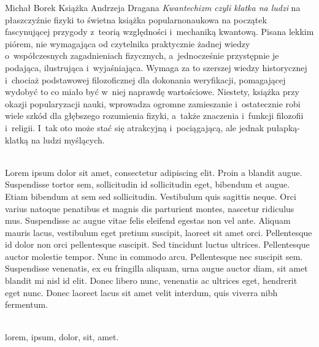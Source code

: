 \begin{newrevplenv}{Michał Borek}
Książka Andrzeja Dragana \textit{Kwantechizm czyli klatka na ludzi} na płaszczyźnie fizyki to świetna książka popularnonaukowa na początek fascynującej przygody z~teorią względności i~mechaniką kwantową. Pisana lekkim piórem, nie wymagająca od czytelnika praktycznie żadnej wiedzy o~współczesnych zagadnieniach fizycznych, a~jednocześnie przystępnie je podająca, ilustrująca i~wyjaśniająca. Wymaga za to szerszej wiedzy historycznej i~chociaż podstawowej filozoficznej dla dokonania weryfikacji, pomagającej wydobyć to co miało być w~niej naprawdę wartościowe. Niestety, książka przy okazji popularyzacji nauki, wprowadza ogromne zamieszanie i~ostatecznie robi wiele szkód dla głębszego rozumienia fizyki, a~także znaczenia i~funkcji filozofii i~religii. I~tak oto może stać się atrakcyjną i~pociągającą, ale jednak pułapką-klatką na ludzi myślących.





\vspace{5mm}%
\begin{flushright}
{\chaptitleeng\color{black!50}{A cage for thinking people}}
\end{flushright}

{}\\
{Lorem ipsum dolor sit amet, consectetur adipiscing elit. Proin a blandit augue. Suspendisse tortor sem, sollicitudin id sollicitudin eget, bibendum et augue. Etiam bibendum at sem sed sollicitudin. Vestibulum quis sagittis neque. Orci varius natoque penatibus et magnis dis parturient montes, nascetur ridiculus mus. Suspendisse ac augue vitae felis eleifend egestas non vel ante. Aliquam mauris lacus, vestibulum eget pretium suscipit, laoreet sit amet orci. Pellentesque id dolor non orci pellentesque suscipit. Sed tincidunt luctus ultrices. Pellentesque auctor molestie tempor. Nunc in commodo arcu. Pellentesque nec suscipit sem. Suspendisse venenatis, ex eu fringilla aliquam, urna augue auctor diam, sit amet blandit mi nisl id elit. Donec libero nunc, venenatis ac ultrices eget, hendrerit eget nunc. Donec laoreet lacus sit amet velit interdum, quis viverra nibh fermentum.}\par%
\vspace{2mm}%
{}\\%
{lorem, ipsum, dolor, sit, amet.}%


\end{newrevplenv}
